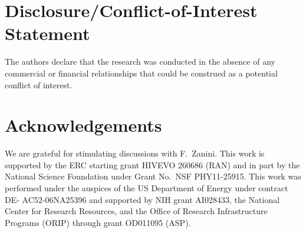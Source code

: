 \documentclass{frontiers}
\begin{document}
\section*{Disclosure/Conflict-of-Interest Statement}
The authors declare that the research was conducted in the absence of
any commercial or financial relationships that could be construed as a
potential conflict of interest.


\section*{Acknowledgements}
We are grateful for stimulating discussions with F.~Zanini. This work
is supported by the ERC starting grant HIVEVO 260686 (RAN) and in part by the National
Science Foundation under Grant No.~NSF PHY11-25915. This work was
performed under the auspices of the US Department of Energy under contract DE-
AC52-06NA25396 and supported by NIH grant AI028433, the National Center
for Research Resources, and the Office of Research Infrastructure Programs (ORIP)
through grant OD011095 (ASP).



%
%


\end{document}
